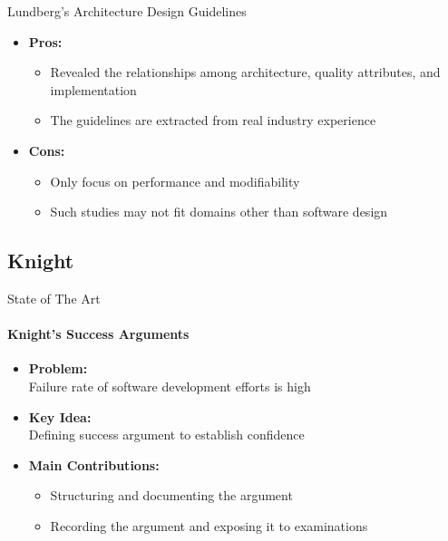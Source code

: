 \documentclass[xcolor=x11names,compress]{beamer}
\renewcommand{\(}{\begin{columns}}
\renewcommand{\)}{\end{columns}}
\newcommand{\<}[1]{\begin{column}{#1}}
\renewcommand{\>}{\end{column}}
\begin{document}
\begin{frame}{Lundberg's Architecture Design Guidelines}
\begin{itemize}
\item \textbf{Pros:} \\
	\begin{itemize}
	\item Revealed the relationships among architecture, quality attributes, and implementation
	\item The guidelines are extracted from real industry experience
    \end{itemize}
\item \textbf{Cons:} \\
    \begin{itemize}
	\item Only focus on performance and modifiability
	\item Such studies may not fit domains other than software design
    \end{itemize}
\end{itemize}
\end{frame}


\subsection{Knight}
\begin{frame}{State of The Art}
\framesubtitle{Knight's Success Arguments \cite{Graydon:successarguments}}
\begin{itemize}
\item \textbf{Problem:}\\Failure rate of software development efforts is high
\item \textbf{Key Idea:} \\Defining success argument to establish confidence
\item \textbf{Main Contributions:}
\begin{itemize}
	\item Structuring and documenting the argument
	\item Recording the argument and exposing it to examinations

\end{itemize}
\end{itemize}

\end{frame}
\end{document}
